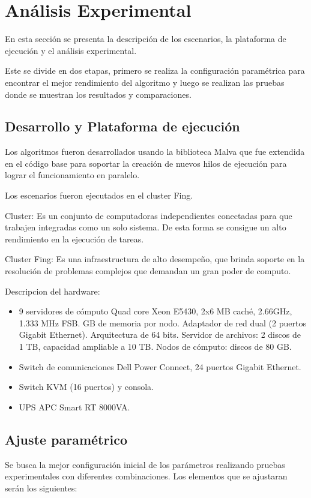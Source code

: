 \chapter{Análisis Experimental}
En esta sección se presenta la descripción de los escenarios, la plataforma de ejecución y el análisis experimental.

Este se divide en dos etapas, primero se realiza la configuración paramétrica para encontrar el mejor rendimiento del algoritmo y luego se realizan las pruebas donde se muestran los resultados y comparaciones.


\section{Desarrollo y Plataforma de ejecución }
Los algoritmos fueron desarrollados usando la biblioteca Malva que fue extendida en el código base para soportar la creación de nuevos hilos de ejecución para lograr el funcionamiento en paralelo.

Los escenarios fueron ejecutados en el cluster Fing.

Cluster: Es un conjunto de computadoras independientes conectadas para que trabajen integradas como un solo sistema. De esta forma se consigue un alto rendimiento en la ejecución de tareas. 

Cluster Fing: Es una infraestructura de alto desempeño, que brinda soporte en la resolución de problemas complejos que demandan un gran poder de computo.

Descripcion del hardware: 
\begin{itemize}
	\item 9 servidores de cómputo
	\subitem Quad core Xeon E5430, 2x6 MB caché, 2.66GHz, 1.333 MHz FSB.
	 GB de memoria por nodo.
	\subitem Adaptador de red dual (2 puertos Gigabit Ethernet).
	\subitem  Arquitectura de 64 bits.
	\subitem Servidor de archivos: 2 discos de 1 TB, capacidad ampliable a 10 TB.
	\subitem Nodos de cómputo: discos de 80 GB.
	\item Switch de comunicaciones
	\subitem Dell Power Connect, 24 puertos Gigabit Ethernet.
	\item Switch KVM (16 puertos) y consola.
	\item UPS APC Smart RT 8000VA.
\end{itemize}

\section{Ajuste paramétrico}
Se busca la mejor configuración inicial de los parámetros realizando pruebas experimentales con diferentes combinaciones.  
Los elementos que se ajustaran serán los siguientes:

